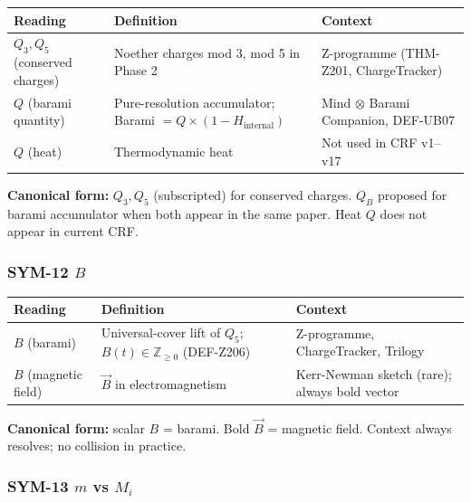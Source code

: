 \documentclass[12pt, a4paper]{article}
\begin{document}
\begin{yellowbox}[title={SYM-11 \textmd{---} $Q$ \textmd{(three readings)}}]
\renewcommand{\arraystretch}{1.35}
\begin{tabular}{p{2.8cm} p{4.5cm} p{4.5cm}}
\toprule
\textbf{Reading} & \textbf{Definition} & \textbf{Context}\\
\midrule
$Q_3, Q_5$ (conserved charges) &
  Noether charges mod 3, mod 5 in Phase 2 &
  Z-programme (THM-Z201, ChargeTracker)\\
$Q$ (barami quantity) &
  Pure-resolution accumulator;
  Barami $= Q \times (1 - H_{\text{internal}})$ &
  Mind $\otimes$ Barami Companion, DEF-UB07\\
$Q$ (heat) &
  Thermodynamic heat &
  Not used in CRF v1--v17\\
\bottomrule
\end{tabular}

\medskip
\textbf{Canonical form:} $Q_3, Q_5$ (subscripted) for conserved
charges. $Q_B$ proposed for barami accumulator when both appear in
the same paper. Heat $Q$ does not appear in current CRF.
\end{yellowbox}

\subsubsection*{SYM-12 \quad $B$}

\begin{yellowbox}[title={SYM-12 \textmd{---} $B$ \textmd{(two readings)}}]
\renewcommand{\arraystretch}{1.35}
\begin{tabular}{p{2.8cm} p{4.5cm} p{4.5cm}}
\toprule
\textbf{Reading} & \textbf{Definition} & \textbf{Context}\\
\midrule
$B$ (barami) &
  Universal-cover lift of $Q_5$;
  $B(t) \in \mathbb{Z}_{\geq 0}$ (DEF-Z206) &
  Z-programme, ChargeTracker, Trilogy\\
$B$ (magnetic field) &
  $\vec{B}$ in electromagnetism &
  Kerr-Newman sketch (rare); always bold vector\\
\bottomrule
\end{tabular}

\medskip
\textbf{Canonical form:} scalar $B$ = barami. Bold $\vec{B}$ =
magnetic field. Context always resolves; no collision in practice.
\end{yellowbox}

\subsubsection*{SYM-13 \quad $m$ vs $M_i$}
\end{document}
